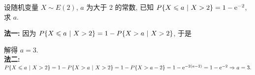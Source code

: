\begin{example}
    设随机变量 $X\sim E(2)$, $a$ 为大于 2 的常数, 已知 $P\qty{X\leqslant a~|~X>2}=1-\mathrm{e}^{-2}$, 求 $a.$
\end{example}
\begin{solution}
    \textbf{法一: }因为 $P\qty{X\leqslant a~|~X>2}=1-P\qty{X>a~|~X>2}$, 于是
    解得 $a=3.$\\
    \textbf{法二: }$P\qty{X\leqslant a~|~X>2}=1-P\qty{X>a~|~X>2}=1-P\qty{X>a-2}=1-\mathrm{e}^{-2(a-2)}=1-\mathrm{e}^{-2}\Rightarrow a=3.$
\end{solution}

